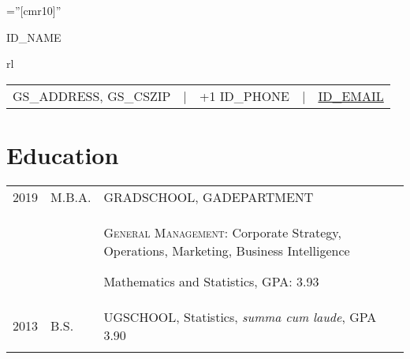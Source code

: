 \documentclass[a4paper,10pt]{article}
\begin{document}

\sloppy







\font\fb=''[cmr10]'' %

\par{\centering
		{\Huge  \textsc{ID_NAME}}
		\smallskip \par
		\begin{tabular}{rl}
		\small
		\begin{tabular}{rllll}
			GS_ADDRESS, GS_CSZIP 	&
			| & +1 ID_PHONE			&
    		| & \href{mailto:ID_EMAIL}{ID_EMAIL}	\\
		\end{tabular}
		\end{tabular}
		\bigskip
		\par}






\section{Education}
\begin{supertabular}{p{2cm} p{1.0cm} p{13.9cm}}
	\textsc{2019}		&		\textsc{M.B.A.} & \textsc{GRADSCHOOL}, \small GADEPARTMENT \\
					&&		 \begin{enumerate*}[label =$\diamond$, itemjoin={\newline}] 
							 \item \footnotesize  \textsc{General Management:} Corporate Strategy, Operations, Marketing, Business Intelligence
							 \item \footnotesize Mathematics and Statistics, GPA: 3.93
							 \end{enumerate*}  \\
	\textsc{2013} 	& 	\textsc{B.S.} & \textsc{UGSCHOOL}, \small Statistics, \emph{summa cum laude}, GPA 3.90 \\
	 \\
\end{supertabular}
\end{document}
